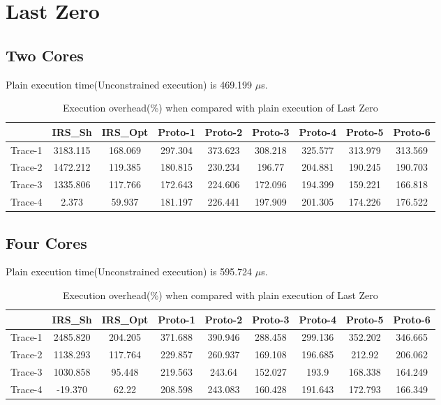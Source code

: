 \section{Last Zero}

\subsection{Two Cores}
Plain execution time(Unconstrained execution) is 469.199 $\mu$s.
\begin{table}[h]
\begin{center}
 \begin{tabular}{|c c c c c c c c c|} 
 \hline
 & IRS\_Sh & IRS\_Opt& Proto-1 & Proto-2 & Proto-3 & Proto-4 & Proto-5 & Proto-6\\ %
 \hline
Trace-1 & 3183.115 & 168.069 & 297.304 & 373.623 & 308.218 & 325.577 & 313.979 & 313.569\\
Trace-2 & 1472.212 & 119.385 & 180.815 & 230.234 & 196.77 & 204.881 & 190.245 & 190.703\\
Trace-3 & 1335.806 & 117.766 & 172.643 & 224.606 & 172.096 & 194.399 & 159.221 & 166.818\\
Trace-4 & 2.373 & 59.937 & 181.197 & 226.441 & 197.909 & 201.305 & 174.226 & 176.522\\
\hline
\end{tabular}
\end{center}
\caption{Execution overhead(\%) when compared with plain execution of Last Zero}
\label{last_zero_irs_res_cores_2}
\end{table}

\subsection{Four Cores}
Plain execution time(Unconstrained execution) is 595.724 $\mu$s.
\begin{table}[h]
\begin{center}
 \begin{tabular}{|c c c c c c c c c|} 
 \hline
 & IRS\_Sh & IRS\_Opt& Proto-1 & Proto-2 & Proto-3 & Proto-4 & Proto-5 & Proto-6\\ %
 \hline
Trace-1 & 2485.820 & 204.205 & 371.688 & 390.946 & 288.458 & 299.136 & 352.202 & 346.665\\
Trace-2 & 1138.293 & 117.764 & 229.857 & 260.937 & 169.108 & 196.685 & 212.92 & 206.062\\
Trace-3 & 1030.858 & 95.448 & 219.563 & 243.64 & 152.027 & 193.9 & 168.338 & 164.249\\
Trace-4 & -19.370 & 62.22 & 208.598 & 243.083 & 160.428 & 191.643 & 172.793 & 166.349\\
\hline
\end{tabular}
\end{center}
\caption{Execution overhead(\%) when compared with plain execution of Last Zero}
\label{last_zero_irs_res_cores_4}
\end{table}


